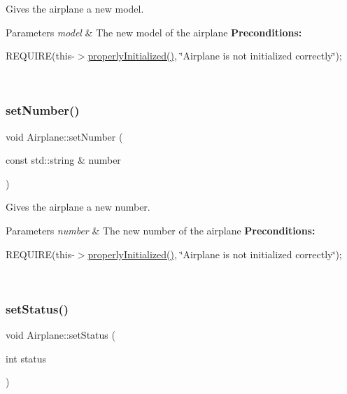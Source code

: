 Gives the airplane a new model. 


\begin{DoxyParams}{Parameters}
{\em model} & The new model of the airplane {\bfseries Preconditions\+:}
\begin{DoxyItemize}
\item R\+E\+Q\+U\+I\+RE(this-\/$>$\mbox{\hyperlink{class_airplane_a6f80df8f692cc8d67d292c1e9f26d59e}{properly\+Initialized()}}, \char`\"{}\+Airplane is not initialized correctly\char`\"{}); 
\end{DoxyItemize}\\
\hline
\end{DoxyParams}
\mbox{\label{class_airplane_af9bf0ea879bf7875b71f552ac9400da7}} 
\subsubsection{\texorpdfstring{set\+Number()}{setNumber()}}
{\footnotesize\ttfamily void Airplane\+::set\+Number (\begin{DoxyParamCaption}\item[{const std\+::string \&}]{number }\end{DoxyParamCaption})}



Gives the airplane a new number. 


\begin{DoxyParams}{Parameters}
{\em number} & The new number of the airplane {\bfseries Preconditions\+:}
\begin{DoxyItemize}
\item R\+E\+Q\+U\+I\+RE(this-\/$>$\mbox{\hyperlink{class_airplane_a6f80df8f692cc8d67d292c1e9f26d59e}{properly\+Initialized()}}, \char`\"{}\+Airplane is not initialized correctly\char`\"{}); 
\end{DoxyItemize}\\
\hline
\end{DoxyParams}
\mbox{\label{class_airplane_a29e3db63862db02af13212800b89d602}} 
\subsubsection{\texorpdfstring{set\+Status()}{setStatus()}}
{\footnotesize\ttfamily void Airplane\+::set\+Status (\begin{DoxyParamCaption}\item[{int}]{status }\end{DoxyParamCaption})}



